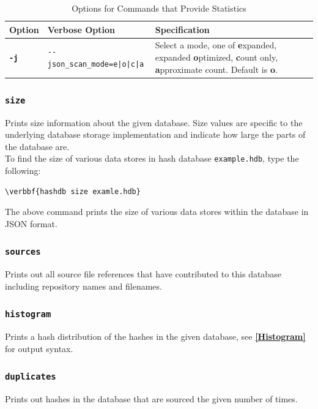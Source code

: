 \documentclass[11pt,fleqn]{article} %
\begin{document}
\begin{table}[!ht]
\centering
\caption{Options for Commands that Provide Statistics}
\label{tab:StatisticsOptions}
\begin{tabular}{|p{1.5 cm}|p{8 cm}|p{4 cm}|}
\hline \hline
\textbf{Option} & \textbf{Verbose Option} & \textbf{Specification} \\
\hline
\textbf{\texttt{-j}} & \verb+--json_scan_mode=e|o|c|a+ & Select a mode, one of \textbf{e}xpanded, expanded \textbf{o}ptimized, \textbf{c}ount only, \textbf{a}pproximate count. Default is \textbf{o}.\\
\hline
\end{tabular}
\end{table}

\subsubsection{\texttt{size}}
Prints size information about the given database. Size values are specific to the underlying database storage implementation and indicate how large the parts of the database are.\\

To find the size of various data stores in hash database \texttt{example.hdb},
type the following:
\begin{Verbatim}[commandchars=\\\{\}]
\verbbf{hashdb size examle.hdb}
\end{Verbatim}
The above command prints the size of various data stores within the database in JSON format.

\subsubsection{\texttt{sources}}
Prints out all source file references that have contributed to this database including repository names and filenames.

\subsubsection{\texttt{histogram}}
Prints a hash distribution of the hashes in the given database, see \textbf{\autoref{Histogram}} for output syntax.

\subsubsection{\texttt{duplicates}}

Prints out hashes in the database that are sourced the given number of times.
\end{document}
